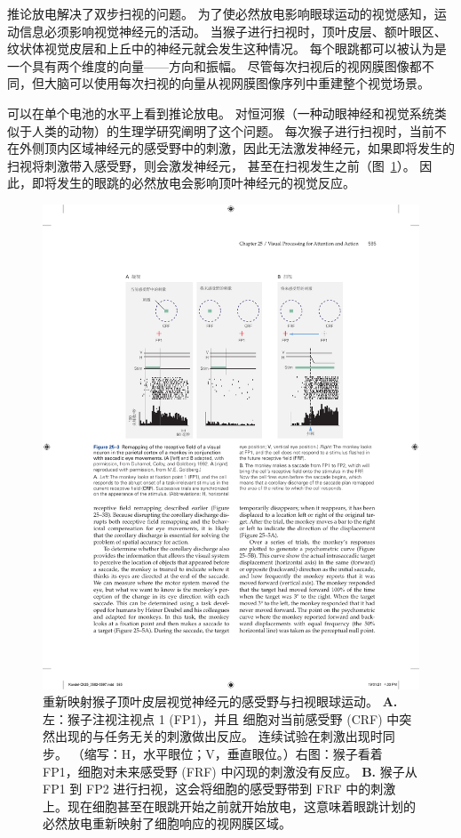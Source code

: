 推论放电解决了双步扫视的问题。
为了使必然放电影响眼球运动的视觉感知，运动信息必须影响视觉神经元的活动。
当猴子进行扫视时，顶叶皮层、额叶眼区、纹状体视觉皮层和上丘中的神经元就会发生这种情况。
每个眼跳都可以被认为是一个具有两个维度的向量——方向和振幅。
尽管每次扫视后的视网膜图像都不同，但大脑可以使用每次扫视的向量从视网膜图像序列中重建整个视觉场景。


可以在单个电池的水平上看到推论放电。
对恒河猴（一种动眼神经和视觉系统类似于人类的动物）的生理学研究阐明了这个问题。
每次猴子进行扫视时，当前不在外侧顶内区域神经元的感受野中的刺激，因此无法激发神经元，如果即将发生的扫视将刺激带入感受野，则会激发神经元， 甚至在扫视发生之前（图~\ref{fig:25_3}）。
因此，即将发生的眼跳的必然放电会影响顶叶神经元的视觉反应。


\begin{figure}[htbp]
	\centering
	\includegraphics[width=0.75\linewidth]{chap25/fig_25_3}
	\caption{重新映射猴子顶叶皮层视觉神经元的感受野与扫视眼球运动\cite{duhamel1992updating}。
		\textbf{A.} 左：猴子注视注视点 1 (FP1)，并且 细胞对当前感受野 (CRF) 中突然出现的与任务无关的刺激做出反应。 连续试验在刺激出现时同步。 （缩写：H，水平眼位；V，垂直眼位。）右图：猴子看着 FP1，细胞对未来感受野 (FRF) 中闪现的刺激没有反应。
		\textbf{B.} 猴子从 FP1 到 FP2 进行扫视，这会将细胞的感受野带到 FRF 中的刺激上。现在细胞甚至在眼跳开始之前就开始放电，这意味着眼跳计划的必然放电重新映射了细胞响应的视网膜区域。}
	\label{fig:25_3}
\end{figure}


